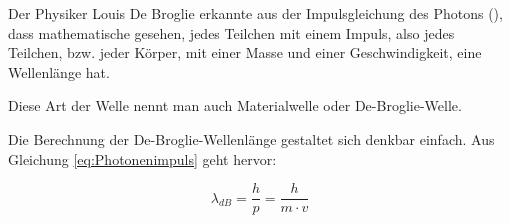 Der Physiker Louis De Broglie erkannte aus der Impulsgleichung des Photons (), dass mathematische gesehen, jedes Teilchen mit einem Impuls, also jedes Teilchen, bzw. jeder Körper, mit einer Masse und einer Geschwindigkeit, eine Wellenlänge hat.

Diese Art der Welle nennt man auch Materialwelle oder De-Broglie-Welle.

Die Berechnung der De-Broglie-Wellenlänge gestaltet sich denkbar einfach. Aus Gleichung \ref{eq:Photonenimpuls} geht hervor:

\begin{equation}
	\lambda_{dB} = \frac{h}{p} = \frac{h}{m \cdot v}
\end{equation}